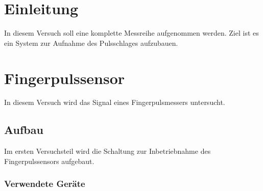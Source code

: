 \documentclass[12pt,a4paper]{article}
\begin{document}
\newpage
\tableofcontents
\newpage
\section{Einleitung}

In diesem Versuch soll eine komplette Messreihe aufgenommen werden.
Ziel ist es ein System zur Aufnahme des Pulsschlages aufzubauen.


\section{Fingerpulssensor}

In diesem Versuch wird das Signal eines Fingerpulsmessers untersucht.

\subsection{Aufbau}

Im ersten Versuchsteil wird die Schaltung zur Inbetriebnahme des Fingerpulssensors aufgebaut.

\subsubsection*{Verwendete Geräte}
\end{document}
